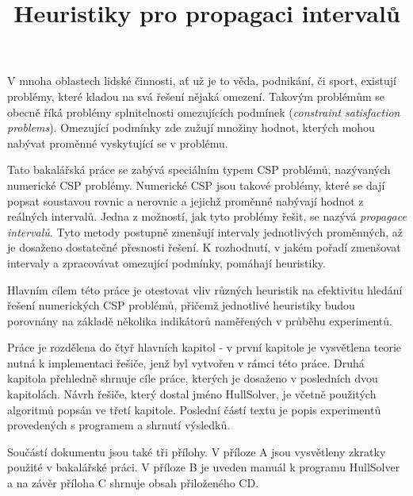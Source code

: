 \documentclass[thesis=B,czech]{FITthesis}[2012/06/26]
\title{Heuristiky pro propagaci intervalů}
\theoremstyle{definition}
\begin{document}

\begin{introduction}
V mnoha oblastech lidské činnosti, ať už je to věda, podnikání, či sport, existují problémy, které kladou na svá řešení nějaká omezení. Takovým problémům se obecně říká problémy splnitelnosti omezujících podmínek (\emph{constraint satisfaction problems}). Omezující podmínky zde zužují množiny hodnot, kterých mohou nabývat proměnné vyskytující se v problému.

Tato bakalářská práce se zabývá speciálním typem CSP problémů, nazývaných numerické CSP problémy. Numerické CSP jsou takové problémy, které se dají popsat soustavou rovnic a nerovnic a jejichž proměnné nabývají hodnot z reálných intervalů. Jedna z možností, jak tyto problémy řešit, se nazývá \emph{propagace intervalů}. Tyto metody postupně zmenšují intervaly jednotlivých proměnných, až je dosaženo dostatečné přesnosti řešení. K rozhodnutí, v jakém pořadí zmenšovat intervaly a zpracovávat omezující podmínky, pomáhají heuristiky.

Hlavním cílem této práce je otestovat vliv různých heuristik na efektivitu hledání řešení numerických CSP problémů, přičemž jednotlivé heuristiky budou porovnány na základě několika indikátorů naměřených v průběhu experimentů.

Práce je rozdělena do čtyř hlavních kapitol - v první kapitole je vysvětlena teorie nutná k implementaci řešiče, jenž byl vytvořen v rámci této práce. Druhá kapitola přehledně shrnuje cíle práce, kterých je dosaženo v posledních dvou kapitolách. Návrh řešiče, který dostal jméno HullSolver, je včetně použitých algoritmů popsán ve třetí kapitole. Poslední částí textu je popis experimentů provedených s programem a shrnutí výsledků.

Součástí dokumentu jsou také tři přílohy. V příloze A jsou vysvětleny zkratky použité v bakalářské práci. V příloze B je uveden manuál k programu HullSolver a na závěr příloha C shrnuje obsah přiloženého CD.


\end{introduction}





\end{document}
